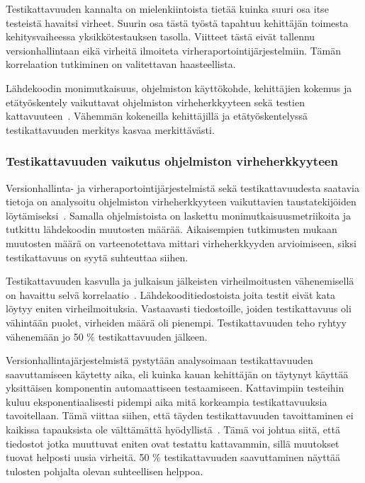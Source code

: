 \documentclass[finnish]{../tktltiki2}
\theoremstyle{definition}
\theoremstyle{remark}
\begin{document}
    Testikattavuuden kannalta on mielenkiintoista tietää kuinka suuri osa itse testeistä havaitsi virheet. Suurin osa 
tästä työstä tapahtuu kehittäjän toimesta kehitysvaiheessa yksikkötestauksen tasolla. Viitteet tästä eivät tallennu 
versionhallintaan eikä virheitä ilmoiteta virheraportointijärjestelmiin. Tämän korrelaation tutkiminen on valitettavan 
haasteellista.

    Lähdekoodin monimutkaisuus, ohjelmiston käyttökohde, kehittäjien kokemus ja etätyöskentely vaikuttavat ohjelmiston 
virheherkkyyteen sekä testien kattavuuteen~\cite{MNDT09}. Vähemmän kokeneilla kehittäjillä ja etätyöskentelyssä 
testikattavuuden merkitys kasvaa merkittävästi. 

\subsubsection{Testikattavuuden vaikutus ohjelmiston virheherkkyyteen}

Versionhallinta- ja virheraportointijärjestelmistä sekä testikattavuudesta saatavia tietoja on analysoitu ohjelmiston 
virheherkkyyteen vaikuttavien taustatekijöiden löytämiseksi~\cite{MNDT09}. Samalla ohjelmistoista on laskettu 
monimutkaisuusmetriikoita ja tutkittu lähdekoodin muutosten määrää. Aikaisempien tutkimusten mukaan muutosten määrä on 
varteenotettava mittari virheherkkyyden arvioimiseen, siksi testikattavuus on syytä suhteuttaa siihen.

    Testikattavuuden kasvulla ja julkaisun jälkeisten virheilmoitusten vähenemisellä on havaittu selvä 
korrelaatio~\cite{MNDT09}. Lähdekooditiedostoista joita testit eivät kata löytyy eniten virheilmoituksia. Vastaavasti 
tiedostoille, joiden testikattavuus oli vähintään puolet, virheiden määrä oli pienempi. Testikattavuuden teho ryhtyy 
vähenemään jo 50 \% testikattavuuden jälkeen.

    Versionhallintajärjestelmistä pystytään analysoimaan testikattavuuden saavuttamiseen käytetty aika, eli kuinka kauan 
kehittäjän on täytynyt käyttää yksittäisen komponentin automaattiseen testaamiseen. Kattavimpiin testeihin kuluu 
eksponentiaalisesti pidempi aika mitä korkeampia testikattavuuksia tavoitellaan. Tämä viittaa siihen, että täyden 
testikattavuuden tavoittaminen ei kaikissa tapauksista ole välttämättä hyödyllistä~\cite{MNDT09}. Tämä voi johtua siitä, 
että tiedostot jotka muuttuvat eniten ovat testattu kattavammin, sillä muutokset tuovat helposti uusia virheitä. 50 \% 
testikattavuuden saavuttaminen näyttää tulosten pohjalta olevan suhteellisen helppoa.
\end{document}
